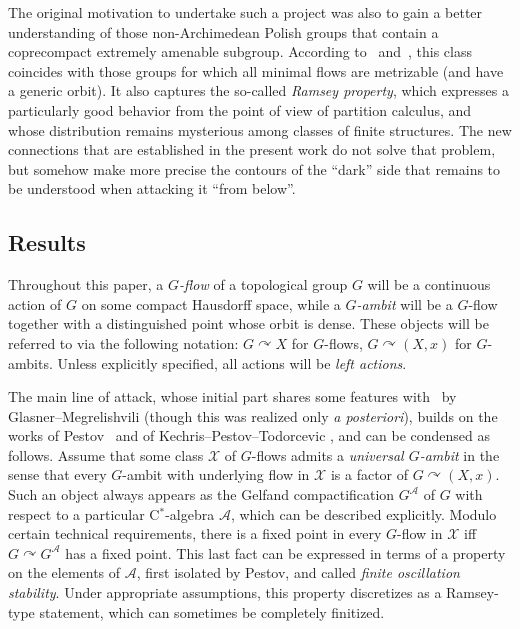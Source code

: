 \documentclass[11pt]{article}
\theoremstyle{definition}
\numberwithin{equation}{section}
\numberwithin{figure}{section}
\numberwithin{table}{section}
\newcommand{\A}{\mathcal A}
\newcommand{\actson}{\curvearrowright}
\begin{document}
The original motivation to undertake such a project was also to gain a better understanding of those non-Archimedean Polish groups that contain a coprecompact extremely amenable subgroup. According to~\cite{MNT} and~\cite{Z2}, this class coincides with those groups for which all minimal flows are metrizable (and have a generic orbit). It also captures the so-called \emph{Ramsey property}, which expresses a particularly good behavior from the point of view of partition calculus, and whose distribution remains mysterious among classes of finite structures. The new connections that are established in the present work do not solve that problem, but somehow make more precise the contours of the ``dark'' side that remains to be understood when attacking it ``from below''.

\subsection{Results}

Throughout this paper, a \emph{$G$-flow} of a topological group $G$ will be a continuous action of $G$ on some compact Hausdorff space, while a \emph{$G$-ambit} will be a $G$-flow together with a distinguished point whose orbit is dense. These objects will be referred to via the following notation: $G\actson X$ for $G$-flows, $G\actson(X,x)$ for $G$-ambits. Unless explicitly specified, all actions will be \emph{left actions}.

The main line of attack, whose initial part shares some features with~\cite[Section~11]{GlM2} by Glasner--Megrelishvili (though this was realized only \emph{a posteriori}), builds on the works of Pestov~\cite{Pe1, Pe0, Pe} and of Kechris--Pestov--Todorcevic \cite{KPT}, and can be condensed as follows. Assume that some class $\mathcal X$ of $G$-flows admits a \emph{universal $G$-ambit} in the sense that every $G$-ambit with underlying flow in $\mathcal X$ is a factor of $G\actson (X,x)$. Such an object always appears as the Gelfand compactification $G^{\A}$ of $G$ with respect to a particular C$^{*}$-algebra $\A$, which can be described explicitly. Modulo certain technical requirements, there is a fixed point in every $G$-flow in $\mathcal X$ iff $G\actson G^{\A}$ has a fixed point. This last fact can be expressed in terms of a property on the elements of $\A$, first isolated by Pestov, and called \emph{finite oscillation stability}. Under appropriate assumptions, this property discretizes as a Ramsey-type statement, which can sometimes be completely finitized.
\end{document}
